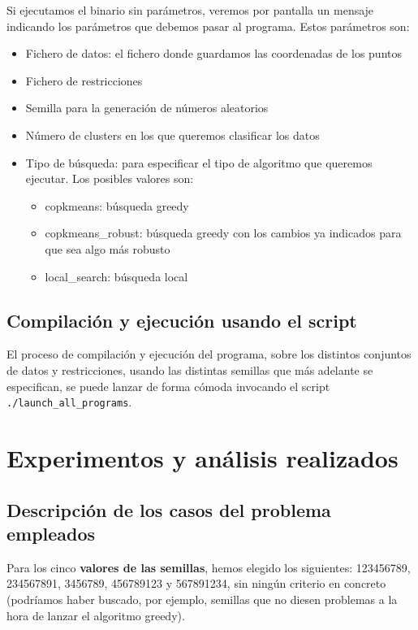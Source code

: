 \documentclass[11pt]{article}
\begin{document}
Si ejecutamos el binario sin parámetros, veremos por pantalla un mensaje indicando los parámetros que debemos pasar al programa. Estos parámetros son:

\begin{itemize}
    \item Fichero de datos: el fichero donde guardamos las coordenadas de los puntos
    \item Fichero de restricciones
    \item Semilla para la generación de números aleatorios
    \item Número de clusters en los que queremos clasificar los datos
    \item Tipo de búsqueda: para especificar el tipo de algoritmo que queremos ejecutar. Los posibles valores son:
    \begin{itemize}
        \item copkmeans: búsqueda greedy
        \item copkmeans\_robust: búsqueda greedy con los cambios ya indicados para que sea algo más robusto
        \item local\_search: búsqueda local
    \end{itemize}
\end{itemize}

\subsection{Compilación y ejecución usando el script}

El proceso de compilación y ejecución del programa, sobre los distintos conjuntos de datos y restricciones, usando las distintas semillas que más adelante se especifican, se puede lanzar de forma cómoda invocando el script \lstinline{./launch_all_programs}.

\pagebreak

\section{Experimentos y análisis realizados}

\subsection{Descripción de los casos del problema empleados}

Para los cinco \textbf{valores de las semillas}, hemos elegido los siguientes: 123456789, 234567891, 3456789, 456789123 y 567891234, sin ningún criterio en concreto (podríamos haber buscado, por ejemplo, semillas que no diesen problemas a la hora de lanzar el algoritmo greedy).
\end{document}

